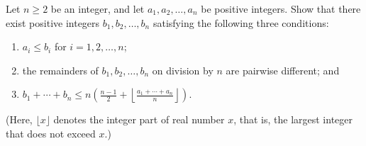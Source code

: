 Let $n\geq2$ be an integer, and let $a_1,a_2,\ldots,a_n$ be positive integers. Show that there exist positive integers $b_1,b_2,\ldots,b_n$ satisfying the following three conditions:
\begin{enumerate}[label=(\Alph*)]
	\item $a_i\leq b_i$ for $i=1,2,\ldots,n$;
	\item the remainders of $b_1,b_2,\ldots,b_n$ on division by $n$ are pairwise different; and
	\item $b_1+\cdots+b_n\leq n\left(\frac{n-1}{2}+\left\lfloor\frac{a_1+\cdots+a_n}{n}\right\rfloor\right)$.
\end{enumerate}

(Here, $\lfloor x\rfloor$ denotes the integer part of real number $x$, that is, the largest integer that does not exceed $x$.)